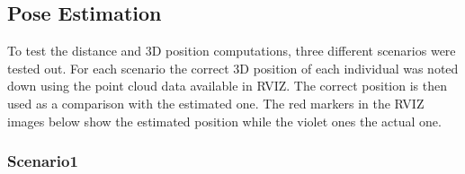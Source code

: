 \subsection{Pose Estimation}

To test the distance and 3D position computations, three different scenarios were tested out. For each scenario the correct 3D position of each individual was noted down using the point cloud data available in RVIZ. The correct position is then used as a comparison with the estimated one. The red markers in the RVIZ images below show the estimated position while the violet ones the actual one.

\subsubsection{Scenario1}

